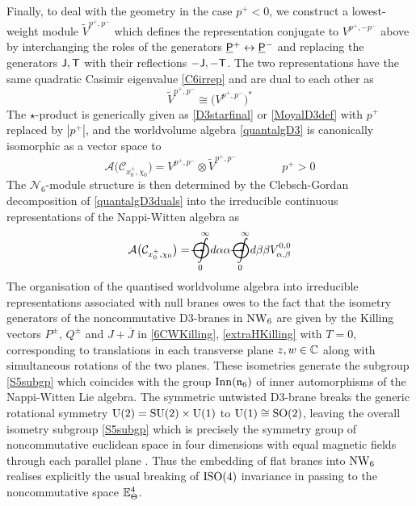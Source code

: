Finally, to deal with the geometry in the case $p^+<0$, we construct a
lowest-weight module $\widetilde{V}^{p^+,p^-}$ which defines the representation
conjugate to $V^{p^+,-p^-}$ above by interchanging the roles of the generators
$\underline{\sf P}{}^+\leftrightarrow\underline{\sf P}{}^-$ and replacing the generators ${\sf J},{\sf T}$ with their
reflections $-{\sf J},-{\sf T}$. The two representations have the same quadratic Casimir
eigenvalue \eqref{C6irrep} and are dual to each other as
\begin{equation}
  \label{dualreps}
  \widetilde{V}^{p^+,p^-} \cong \bigl(V^{p^+,p^-}\bigr)^*
\end{equation}
The $\star$-product is generically given as \eqref{D3starfinal} or
\eqref{MoyalD3def} with $p^+$ replaced by $|p^+|$, and the worldvolume algebra
\eqref{quantalgD3} is canonically isomorphic as a vector space to
\begin{equation}
  \label{quantalgD3duals}
  \mathcal{A}\bigl(\mathcal{C}_{x_0^+,\chi_0}\bigr)=V^{p^+,p^-}
  \otimes\widetilde{V}^{p^+,p^-} \qquad\qquad p^+>0
\end{equation}
The $\mathcal{N}_6$-module structure is then determined by the Clebsch-Gordan
decomposition of \eqref{quantalgD3duals} into the irreducible continuous
representations of the Nappi-Witten algebra as
\begin{equation}
  \label{D3module}
  \mathcal{A}\bigl(\mathcal{C}_{x_0^+,\chi_0}\bigr)=
  \hspace{4pt}\int\limits_0^\infty
  \hspace{-15.6pt}\bigodot\hspace{-19pt}\mbf-\hspace{-4pt}\mbf-\hspace{4pt}
  d\alpha \alpha
  \hspace{4pt}\int\limits_0^\infty
  \hspace{-15.6pt}\bigodot\hspace{-19pt}\mbf-\hspace{-4pt}\mbf-\hspace{4pt}
  d\beta \beta  V_{\alpha,\beta}^{0,0}
\end{equation}
The organisation of the quantised worldvolume algebra into irreducible
representations associated with null branes owes to the fact that the isometry
generators of the noncommutative D3-branes in $\operatorname{NW}_6$ are given by the Killing
vectors $P^\pm$, $Q^\pm$ and $J+\overline{J}$ in \eqref{6CWKilling},
\ref{extraHKilling} with $T=0$, corresponding to translations in each transverse
plane $z,w\in{\mathbb C}$ along with simultaneous rotations of the two planes.
These isometries generate the subgroup \eqref{S5subgp} which coincides with the
group ${\rm Inn}(\mathfrak{n}_6)$ of inner automorphisms of the Nappi-Witten Lie
algebra. The symmetric untwisted D3-brane breaks the generic rotational symmetry
${\rm U}(2)={\rm SU}(2)\times{\rm U}(1)$ to ${\rm U}(1)\cong{\rm SO}(2)$,
leaving the overall isometry subgroup \eqref{S5subgp} which is precisely the
symmetry group of noncommutative euclidean space in four dimensions with equal
magnetic fields through each parallel plane \cite{AlVaz1,CMNTV1}. Thus the
embedding of flat branes into $\operatorname{NW}_6$ realises explicitly the usual breaking of
${\rm ISO}(4)$ invariance in passing to the noncommutative space
${\mathbb E}_\Theta^4$.

